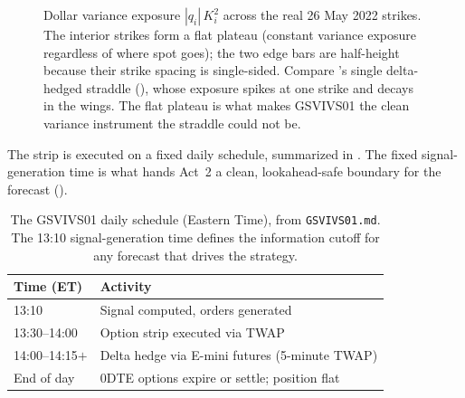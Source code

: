 \begin{figure}[ht]
\centering
{}
\caption{Dollar variance exposure $|q_i|\,K_i^2$ across the real 26 May 2022 strikes. The interior strikes form a flat plateau (constant variance exposure regardless of where spot goes); the two edge bars are half-height because their strike spacing is single-sided. Compare 's single delta-hedged straddle (), whose exposure spikes at one strike and decays in the wings. The flat plateau is what makes GSVIVS01 the clean variance instrument the straddle could not be.}
\label{fig:gsvivs:flatgamma}
\end{figure}

The strip is executed on a fixed daily schedule, summarized in . The fixed signal-generation time is what hands Act~2 a clean, lookahead-safe boundary for the forecast ().

\begin{table}[ht]
\centering
\caption{The GSVIVS01 daily schedule (Eastern Time), from \texttt{GSVIVS01.md}. The 13:10 signal-generation time defines the information cutoff for any forecast that drives the strategy.}
\label{tab:gsvivs:schedule}
\begin{tabular}{ll}
\toprule
Time (ET) & Activity \\
\midrule
13:10 & Signal computed, orders generated \\
13:30--14:00 & Option strip executed via TWAP \\
14:00--14:15$+$ & Delta hedge via E-mini futures (5-minute TWAP) \\
End of day & 0DTE options expire or settle; position flat \\
\bottomrule
\end{tabular}
\end{table}

